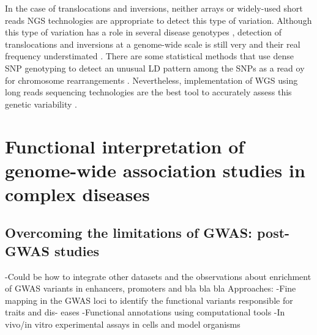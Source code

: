 In the case of translocations and inversions, neither arrays or widely-used short reads NGS technologies are appropriate to detect this type of variation. Although this type of variation has a role in several disease genotypes \parencite{Feuk2010}, detection of  translocations and inversions at a genome-wide scale is still very and their real frequency understimated \parencite{Ku2010}. There are some statistical methods that use dense SNP genotyping to detect an unusual LD pattern among the SNPs as a read oy for chromosome rearrangements \parencite{Bansal2007}. Nevertheless, implementation of WGS using long reads sequencing technologies are the best tool to accurately assess this genetic variability \parencite{Visscher2017}. 




	

	


\section{Functional interpretation of genome-wide association studies in complex diseases}
\subsection{Overcoming the limitations of GWAS: post-GWAS studies}
-Could be how to integrate other datasets and the observations about enrichment of GWAS variants in enhancers, promoters and bla bla bla
Approaches:
	-Fine mapping in the GWAS loci to identify the functional variants responsible for traits and dis-
 eases
	-Functional annotations using computational tools
	-In vivo/in vitro experimental assays in cells and model organisms
	

